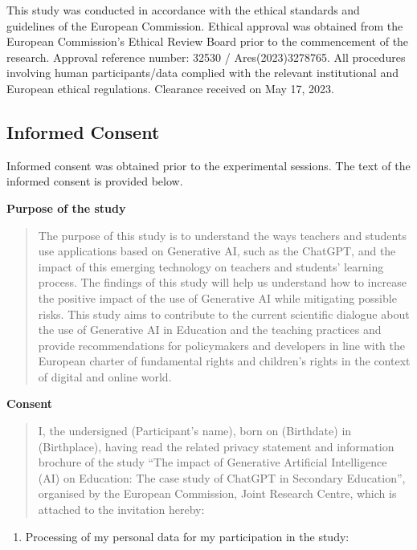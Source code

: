 \documentclass[
  12pt,
]{article}
\providecommand{\tightlist}{%
  \setlength{\itemsep}{0pt}\setlength{\parskip}{0pt}}
\begin{document}
This study was conducted in accordance with the ethical standards and guidelines of the European Commission. Ethical approval was obtained from the European Commission's Ethical Review Board prior to the commencement of the research. Approval reference number: 32530 / Ares(2023)3278765. All procedures involving human participants/data complied with the relevant institutional and European ethical regulations. Clearance received on May 17, 2023.

\subsection{Informed Consent}\label{informed-consent}

Informed consent was obtained prior to the experimental sessions. The text of the informed consent is provided below.

\textbf{Purpose of the study}

\begin{quote}
The purpose of this study is to understand the ways teachers and students use applications based on Generative AI, such as the ChatGPT, and the impact of this emerging technology on teachers and students' learning process. The findings of this study will help us understand how to increase the positive impact of the use of Generative AI while mitigating possible risks. This study aims to contribute to the current scientific dialogue about the use of Generative AI in Education and the teaching practices and provide recommendations for policymakers and developers in line with the European charter of fundamental rights and children's rights in the context of digital and online world.
\end{quote}

\textbf{Consent}

\begin{quote}
I, the undersigned (Participant's name), born on (Birthdate) in (Birthplace), having read the related privacy statement and information brochure of the study ``The impact of Generative Artificial Intelligence (AI) on Education: The case study of ChatGPT in Secondary Education'', organised by the European Commission, Joint Research Centre, which is attached to the invitation hereby:
\end{quote}

\begin{enumerate}
\def\labelenumi{(\arabic{enumi})}
\tightlist
\item
  Processing of my personal data for my participation in the study:
\end{enumerate}
\end{document}
